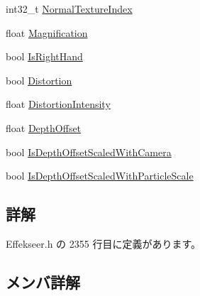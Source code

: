 \begin{DoxyCompactItemize}
\item 
int32\+\_\+t \mbox{\hyperlink{struct_effekseer_1_1_model_renderer_1_1_node_parameter_abad17228020f70a3f2ac1d05c25f73ac}{Normal\+Texture\+Index}}
\item 
float \mbox{\hyperlink{struct_effekseer_1_1_model_renderer_1_1_node_parameter_a2795f9c10fd867586eaf942ddb772364}{Magnification}}
\item 
bool \mbox{\hyperlink{struct_effekseer_1_1_model_renderer_1_1_node_parameter_aa6a88952b1eb5e94d718a8523a1082fc}{Is\+Right\+Hand}}
\item 
bool \mbox{\hyperlink{struct_effekseer_1_1_model_renderer_1_1_node_parameter_adb4920c1697cfdee2cd7fff84a7ebc11}{Distortion}}
\item 
float \mbox{\hyperlink{struct_effekseer_1_1_model_renderer_1_1_node_parameter_aebe9d866f67f827bcd6fcba2721f57ac}{Distortion\+Intensity}}
\item 
float \mbox{\hyperlink{struct_effekseer_1_1_model_renderer_1_1_node_parameter_a53b8a8653231f5f9a7d4721e76f78f36}{Depth\+Offset}}
\item 
bool \mbox{\hyperlink{struct_effekseer_1_1_model_renderer_1_1_node_parameter_a58602ab7f71d1a8ead8a7e9b0168b5e7}{Is\+Depth\+Offset\+Scaled\+With\+Camera}}
\item 
bool \mbox{\hyperlink{struct_effekseer_1_1_model_renderer_1_1_node_parameter_a4826b66cd9c8841881d1e405b4d9ef16}{Is\+Depth\+Offset\+Scaled\+With\+Particle\+Scale}}
\end{DoxyCompactItemize}


\subsection{詳解}


 Effekseer.\+h の 2355 行目に定義があります。



\subsection{メンバ詳解}
\mbox{\label{struct_effekseer_1_1_model_renderer_1_1_node_parameter_a412adbcede66578e67fc52338df61843}} 

